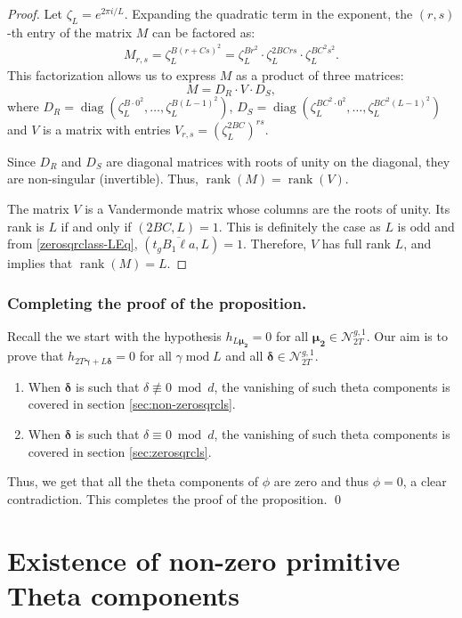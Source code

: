 \documentclass[11pt]{amsart}
\numberwithin{equation}{section}
\newcommand{\mc}{\mathcal}
\renewcommand*{\mod}{\operatorname{mod}}
\begin{document}
\begin{proof}
Let $\zeta_L = e^{2\pi i / L}$. Expanding the quadratic term in the exponent, the $(r,s)$-th entry of the matrix $M$ can be factored as:
\begin{align*}
M_{r,s}= \zeta_L^{B(r+Cs)^2}= \zeta_L^{Br^2} \cdot \zeta_L^{2BCrs} \cdot \zeta_L^{BC^2s^2}.
\end{align*}
This factorization allows us to express $M$ as a product of three matrices:
\[
M = D_R\cdot V \cdot D_S,
\]
where $D_R = \operatorname{diag}(\zeta_L^{B \cdot 0^2}, \dots, \zeta_L^{B(L-1)^2})$, $D_S = \operatorname{diag}(\zeta_L^{BC^2 \cdot 0^2}, \dots, \zeta_L^{BC^2(L-1)^2})$ and $V$ is a matrix with entries $V_{r,s}=(\zeta_L^{2BC})^{rs}$.


Since $D_R$ and $D_S$ are diagonal matrices with roots of unity on the diagonal, they are non-singular (invertible). Thus, $\operatorname{rank}(M) = \operatorname{rank}(V)$.

The matrix $V$ is a Vandermonde matrix whose columns are the roots of unity. Its rank is $L$ if and only if $(2BC, L) = 1$. This is definitely the case as $L$ is odd and from \eqref{zerosqrclass-LEq}, $(t_g\overline{B_1\ell a}, L)=1$. Therefore, $V$ has full rank $L$, and implies that $\operatorname{rank}(M) = L$.
\end{proof}
\subsubsection{Completing the proof of the proposition.} Recall the we start with the hypothesis $h_{L\bm{\mu_2}}=0$ for all $\bm{\mu_2}\in \mc N_{2T}^{g,1}$. Our aim is to prove that $h_{2T{\bm{ \gamma}}+L\bm{\delta}}=0$ for all $\gamma\mod L$ and all $\bm{\delta}\in \mc N_{2T}^{g,1}$.
\begin{enumerate}
    \item When $\bm\delta$ is such that $\delta\not\equiv 0 \bmod d$, the vanishing of such theta components is covered in section \ref{sec:non-zerosqrcls}.
    \item When $\bm\delta$ is such that $\delta\equiv 0 \bmod d$, the vanishing of such theta components is covered in section \ref{sec:zerosqrcls}.
\end{enumerate}
Thus, we get that all the theta components of $\phi$ are zero and thus $\phi=0$, a clear contradiction. This completes the proof of the proposition. \qed

\section{Existence of non-zero primitive Theta components}
\end{document}

